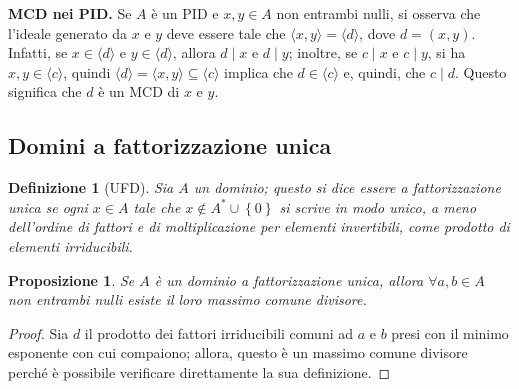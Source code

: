\documentclass[12pt]{scrartcl}
\theoremstyle{style}
\newtheorem{definizione}{Definizione}[section]
\newtheorem{prop}{Proposizione}[section]
\numberwithin{equation}{subsection}
\begin{document}
\textbf{MCD nei PID.} Se $A$ \`e un PID e $x,y \in A$ non entrambi nulli, si osserva che l'ideale generato da $x$ e $y$ deve essere tale che $\langle x,y \rangle=\langle d \rangle$, dove $d = (x,y)$.
Infatti, se $x \in \langle d \rangle$ e $y \in \langle d \rangle$, allora $d  \mid x $ e $d \mid y$; inoltre, se $c  \mid x $ e $c \mid y$, si ha $x,y \in \langle c \rangle$, quindi $\langle d \rangle=\langle x,y \rangle \subseteq \langle c \rangle$ implica che $d \in \langle c \rangle$ e, quindi, che $c \mid d$.
Questo significa che $d$ \`e un MCD di $x$ e $y$.

\subsection{Domini a fattorizzazione unica}
\begin{definizione}
	[UFD]
	Sia $A$ un dominio; questo si dice essere \textit{a fattorizzazione unica} se ogni $ x \in A$ tale che $x\not\in A^* \cup \left\{ 0 \right\} $ si scrive in modo unico, a meno dell'ordine di fattori e di moltiplicazione per elementi invertibili, come prodotto di elementi irriducibili.
\end{definizione}
\begin{prop}
	Se $A$ \`e un dominio a fattorizzazione unica, allora $\forall a,b \in A$ non entrambi nulli esiste il loro massimo comune divisore.
\end{prop}
	\begin{proof}
		Sia $d$ il prodotto dei fattori irriducibili comuni ad $a$ e $b$ presi con il minimo esponente con cui compaiono; allora, questo \`e un massimo comune divisore perch\'e \`e possibile verificare direttamente la sua definizione.
	\end{proof}
\end{document}
